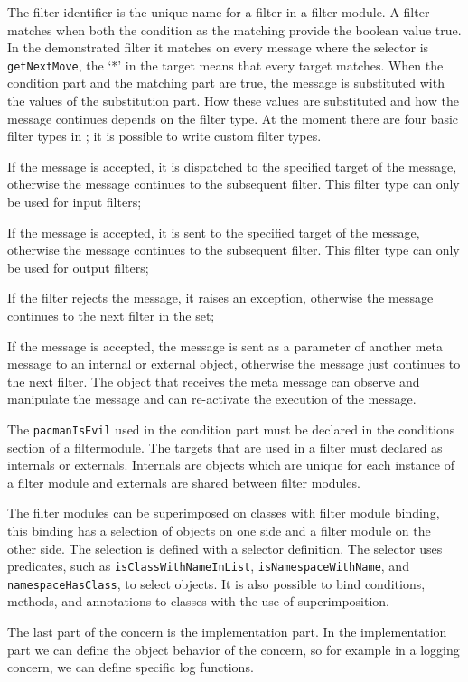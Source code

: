 The filter identifier is the unique name for a filter in a filter module. 
A filter matches when both the condition as the matching provide the boolean value true.
In the demonstrated filter it matches on every
message where the selector is \lstinline!getNextMove!, the `*' in the target means that every target matches.
When the condition part and the matching part are true, the message is substituted with the values of the substitution part. How these values are substituted and
how the message continues depends on the filter type. At the moment there are four basic filter types in \Compose*; it is possible to write custom filter types.

\begin{description}[style=nextline,noitemsep]
\item [Dispatch] If the message is accepted, it is dispatched to the specified target of the message,
otherwise the message continues to the subsequent filter. This filter type can only be used for
input filters;
\item [Send] If the message is accepted, it is sent to the specified target of the message,
otherwise the message continues to the subsequent filter. This filter type can only be used for
output filters;
\item [Error] If the filter rejects the message, it raises an exception, otherwise the message continues
to the next filter in the set;
\item [Meta] If the message is accepted, the message is sent as a parameter of another meta message
to an internal or external object, otherwise the message just continues to the next filter. The object that receives the
meta message can observe and manipulate the message and can re-activate the execution of the message.
\end{description}

The \lstinline|pacmanIsEvil| used in the condition part must be declared in the conditions section of
a filtermodule. The targets that are used in a filter must declared as internals or externals.
Internals are objects which are unique for each instance of a filter module and
externals are shared between filter modules.

The filter modules can be superimposed on classes with filter module binding, this binding
has a selection of objects on one side and a filter module on the other side. The selection
is defined with a selector definition. The selector uses predicates, such as
\lstinline|isClassWithNameInList|, \lstinline|isNamespaceWithName|, and \lstinline|namespaceHasClass|,
to select objects. It is also possible to bind conditions, methods, and annotations to classes with the use of superimposition.

The last part of the concern is the implementation part. In the implementation part we can define the object behavior of the concern, so for example in a logging concern, we can define specific log functions.
